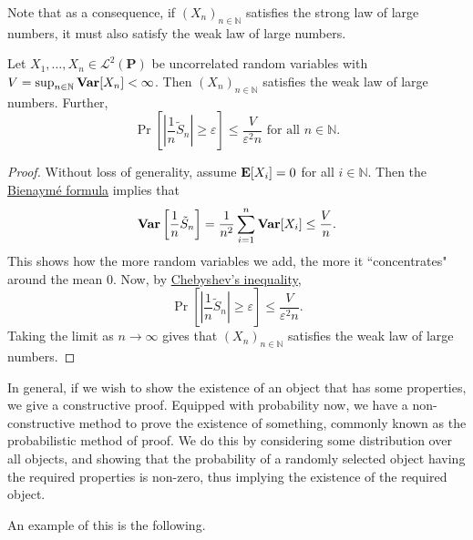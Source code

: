 \vspace{2mm}
Note that as a consequence, if $(X_n)_{n\in\mathbb{N}}$ satisfies the strong law of large numbers, it must also satisfy the weak law of large numbers.

\begin{ftheo}
    Let $X_1,\ldots,X_n\in\mathcal{L}^2(\textbf{P})$ be uncorrelated random variables with $V=\sup_{n\in\mathbb{N}}\operatorname{\textbf{Var}}[X_n]<\infty$. Then $(X_n)_{n\in\mathbb{N}}$ satisfies the weak law of large numbers. Further,
    $$\Pr\left[\left|\frac{1}{n}\tilde{S}_n\right|\geq\varepsilon\right]\leq \frac{V}{\varepsilon^2n}\text{ for all $n\in\mathbb{N}$}.$$
\end{ftheo}
\begin{proof}
    Without loss of generality, assume $\textbf{E}[X_i]=0$ for all $i\in\mathbb{N}$. Then the \hyperref[bienayme formula]{Bienaym\'{e} formula} implies that
    $$\operatorname{\textbf{Var}}\left[\frac{1}{n}\tilde{S}_n\right]=\frac{1}{n^2}\sum_{i=1}^n \operatorname{\textbf{Var}}[X_i] \leq \frac{V}{n}.$$
    This shows how the more random variables we add, the more it ``concentrates" around the mean $0$.
    Now, by \hyperref[chebyshev inequality]{Chebyshev's inequality},
    $$\Pr\left[\left|\frac{1}{n}\tilde{S}_n\right|\geq\varepsilon\right]\leq \frac{V}{\varepsilon^2n}.$$
    Taking the limit as $n\to\infty$ gives that $(X_n)_{n\in\mathbb{N}}$ satisfies the weak law of large numbers.
\end{proof}

In general, if we wish to show the existence of an object that has some properties, we give a constructive proof. Equipped with probability now, we have a non-constructive method to prove the existence of something, commonly known as the probabilistic method of proof. We do this by considering some distribution over all objects, and showing that the probability of a randomly selected object having the required properties is non-zero, thus implying the existence of the required object.

An example of this is the following.

